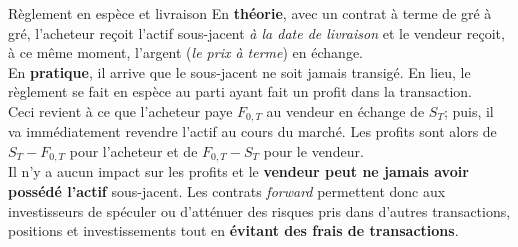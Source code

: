 \documentclass[10pt, french]{article}
\begin{document}
\begin{multicols*}{2}
\begin{conceptgen}{Règlement en espèce et livraison}
En \textbf{théorie}, avec un contrat à terme de gré à gré, l'acheteur reçoit l'actif sous-jacent \textit{à la date de livraison} et le vendeur reçoit, à ce même moment, l'argent (\textit{le prix à terme}) en échange.\\

En \textbf{pratique}, il arrive que le sous-jacent ne soit jamais transigé. En lieu, le règlement se fait en espèce au parti ayant fait un profit dans la transaction.\\

Ceci revient à ce que l'acheteur paye $F_{0, T}$ au vendeur en échange de $S_{T}$; puis, il va immédiatement revendre l'actif au cours du marché. Les profits sont alors de $S_{T} - F_{0, T}$ pour l'acheteur et de $F_{0, T} - S_{T}$ pour le vendeur.\\

Il n'y a aucun impact sur les profits et le \textbf{vendeur peut ne jamais avoir possédé l'actif} sous-jacent. Les contrats \og \textit{forward} \fg{} permettent donc aux investisseurs de spéculer ou d'atténuer des risques pris dans d'autres transactions, positions et investissements tout en \textbf{évitant des frais de transactions}.
\end{conceptgen}
\end{multicols*}
\newpage
\end{document}
